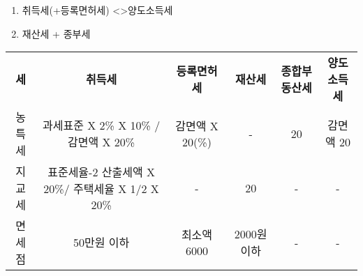 \documentclass{oblivoir}
\begin{document}
\begin{enumerate}
\def\labelenumi{\arabic{enumi}.}
\itemsep1pt\parskip0pt
\item
  취득세(+등록면허세) \textless{}\textgreater{}양도소득세
\item
  재산세 + 종부세
\end{enumerate}

\begin{table}[]
\begin{tabular}{cccccc}
\rowcolor[HTML]{F0F0F0} 
{\color[HTML]{3F3F3F} \textbf{세}} &
  {\color[HTML]{3F3F3F} \textbf{취득세}} &
  {\color[HTML]{3F3F3F} \textbf{등록면허세}} &
  {\color[HTML]{3F3F3F} \textbf{재산세}} &
  {\color[HTML]{3F3F3F} \textbf{종합부동산세}} &
  {\color[HTML]{3F3F3F} \textbf{양도소득세}} \\
\rowcolor[HTML]{FDFDFD} 
{\color[HTML]{3F3F3F} 농특세} &
  {\color[HTML]{3F3F3F} 과세표준 X 2\% X 10\% / 감면액 X 20\%} &
  {\color[HTML]{3F3F3F} 감면액 X 20(\%)} &
  {\color[HTML]{3F3F3F} -} &
  {\color[HTML]{3F3F3F} 20} &
  {\color[HTML]{3F3F3F} 감면액 20} \\
\rowcolor[HTML]{F7F7F7} 
{\color[HTML]{3F3F3F} 지교세} &
  {\color[HTML]{3F3F3F} 표준세율-2 산출세액 X 20\%/ 주택세율 X 1/2 X 20\%} &
  {\color[HTML]{3F3F3F} -} &
  {\color[HTML]{3F3F3F} 20} &
  {\color[HTML]{3F3F3F} -} &
  {\color[HTML]{3F3F3F} -} \\
\rowcolor[HTML]{FDFDFD} 
{\color[HTML]{3F3F3F} 면세점} &
  {\color[HTML]{3F3F3F} 50만원 이하} &
  {\color[HTML]{3F3F3F} 최소액 6000} &
  {\color[HTML]{3F3F3F} 2000원 이하} &
  {\color[HTML]{3F3F3F} -} &
  {\color[HTML]{3F3F3F} -}
\end{tabular}
\end{table}
\end{document}

